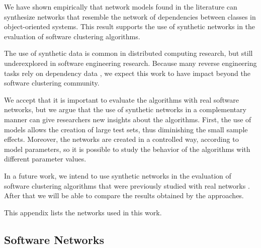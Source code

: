 We have shown empirically that network models found in the literature can
synthesize networks that resemble the network of dependencies between classes in
object-oriented systems. This result supports the use of synthetic networks in
the evaluation of software clustering algorithms.

The use of synthetic data is common in distributed computing research, but still
underexplored in software engineering research. Because many reverse engineering
tasks rely on dependency data \cite{Tonella2007}, we expect this work to have
impact beyond the software clustering community.


We accept that it is important to evaluate the algorithms with real software
networks, but we argue that the use of synthetic networks in a complementary
manner can give researchers new insights about the algorithms. First, the use of
models allows the creation of large test sets, thus diminishing the small sample
effects. Moreover, the networks are created in a controlled way, according to
model parameters, so it is possible to study the behavior of the algorithms with
different parameter values.

In a future work, we intend to use synthetic networks in the evaluation of
software clustering algorithms that were previously studied with real networks
\cite{Wu2005}. After that we will be able to compare the results obtained by
the approaches.

\appendix %

This appendix lists the networks used in this work.

\subsection{Software Networks}

